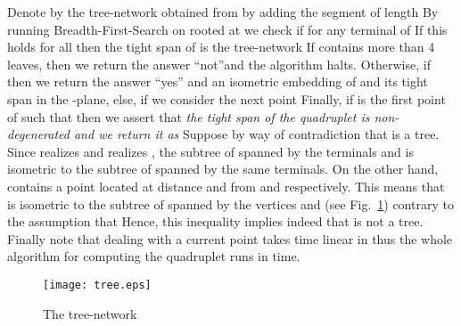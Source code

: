 \documentclass[11pt]{amsart}
\begin{document}
Denote by  the tree-network obtained from  by adding the segment  of length  By running  Breadth-First-Search on   rooted at   we check if  for any terminal  of  If this holds for all  then the tight span of  is the tree-network  If  contains more than 4 leaves, then we return the answer ``not''and the algorithm halts. Otherwise, if  then we return the answer  ``yes'' and an isometric embedding of  and its tight
span  in the -plane, else, if   we consider the next point  Finally, if  is the first point of  such that 
then we assert that {\it the tight span of the quadruplet  is non-degenerated and we return it as } Suppose by way of contradiction that  is a tree.
Since  realizes  and  realizes
, the subtree of  spanned by the terminals
 and  is isometric to the subtree of 
spanned by the same terminals. On the other hand,  contains a point  located at
distance  and  from
 and  respectively.
This means that  is isometric to the subtree of 
spanned by the vertices  and  (see Fig.~\ref{tree_A_i}) contrary to the
assumption that 
Hence, this inequality implies indeed that  is not a tree. Finally note that dealing with a current
point  takes time linear in  thus the whole
algorithm for computing the quadruplet  runs in  time.

\begin{figure}
\begin{center}
    \texttt{[image: tree.eps]}
\end{center}
\caption{The tree-network }
\label{tree_A_i}
\end{figure}
\end{document}
